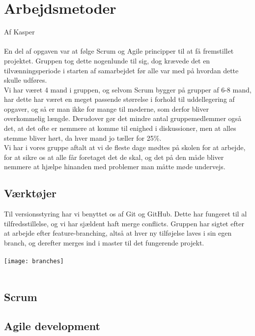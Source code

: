 \section{Arbejdsmetoder}
Af Kasper\\\\
En del af opgaven var at følge Scrum og Agile principper til at få fremstillet projektet. Gruppen tog dette nogenlunde til sig, dog krævede det en tilvænningsperiode i starten af samarbejdet før alle var med på hvordan dette skulle udføres.\\
Vi har været 4 mand i gruppen, og selvom Scrum bygger på grupper af 6-8 mand, har dette har været en meget passende størrelse i forhold til uddellegering af opgaver, og så er man ikke for mange til møderne, som derfor bliver overkommelig længde.
Derudover gør det mindre antal gruppemedlemmer også det, at det ofte er nemmere at komme til enighed i diskussioner, men at alles stemme bliver hørt, da hver mand jo tæller for 25\%.\\
Vi har i vores gruppe aftalt at vi de fleste dage mødtes på skolen for at arbejde, for at sikre os at alle får foretaget det de skal, og det på den måde bliver nemmere at hjælpe hinanden med problemer man måtte møde undervejs.

\subsection{Værktøjer}
Til versionsstyring har vi benyttet os af Git og GitHub. Dette har fungeret til al tilfredsstillelse, og vi har sjældent haft merge conflicts. Gruppen har sigtet efter at arbejde efter feature-branching, altså at hver ny tilføjelse laves i sin egen branch, og derefter merges ind i master til det fungerende projekt.\\\\
\texttt{[image: branches]}\\\\


\subsection{Scrum}

\subsection{Agile development}